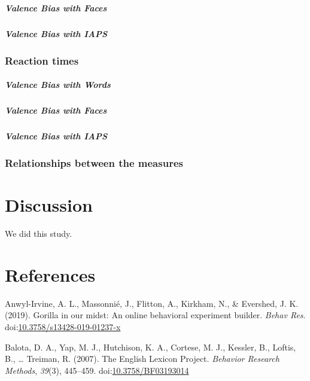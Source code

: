 \documentclass[man]{apa6}
\let\oldsubparagraph\subparagraph
\renewcommand{\subparagraph}[1]{\oldsubparagraph{#1}\mbox{}}
\begin{document}
\hypertarget{valence-bias-with-faces}{%
\subparagraph{Valence Bias with Faces}\label{valence-bias-with-faces}}

\hypertarget{valence-bias-with-iaps}{%
\subparagraph{Valence Bias with IAPS}\label{valence-bias-with-iaps}}

\hypertarget{reaction-times}{%
\subsubsection{Reaction times}\label{reaction-times}}

\hypertarget{valence-bias-with-words}{%
\subparagraph{Valence Bias with Words}\label{valence-bias-with-words}}

\hypertarget{valence-bias-with-faces-1}{%
\subparagraph{Valence Bias with Faces}\label{valence-bias-with-faces-1}}

\hypertarget{valence-bias-with-iaps-1}{%
\subparagraph{Valence Bias with IAPS}\label{valence-bias-with-iaps-1}}

\hypertarget{relationships-between-the-measures}{%
\subsubsection{Relationships between the measures}\label{relationships-between-the-measures}}

\hypertarget{discussion}{%
\section{Discussion}\label{discussion}}

We did this study.

\newpage

\hypertarget{references}{%
\section{References}\label{references}}

\begingroup
\setlength{\parindent}{-0.5in}
\setlength{\leftskip}{0.5in}

\hypertarget{refs}{}
\leavevmode\hypertarget{ref-anwyl-irvine_gorilla_2019}{}%
Anwyl-Irvine, A. L., Massonnié, J., Flitton, A., Kirkham, N., \& Evershed, J. K. (2019). Gorilla in our midst: An online behavioral experiment builder. \emph{Behav Res}. doi:\href{https://doi.org/10.3758/s13428-019-01237-x}{10.3758/s13428-019-01237-x}

\leavevmode\hypertarget{ref-balota_english_2007}{}%
Balota, D. A., Yap, M. J., Hutchison, K. A., Cortese, M. J., Kessler, B., Loftis, B., \ldots{} Treiman, R. (2007). The English Lexicon Project. \emph{Behavior Research Methods}, \emph{39}(3), 445--459. doi:\href{https://doi.org/10.3758/BF03193014}{10.3758/BF03193014}
\end{document}

